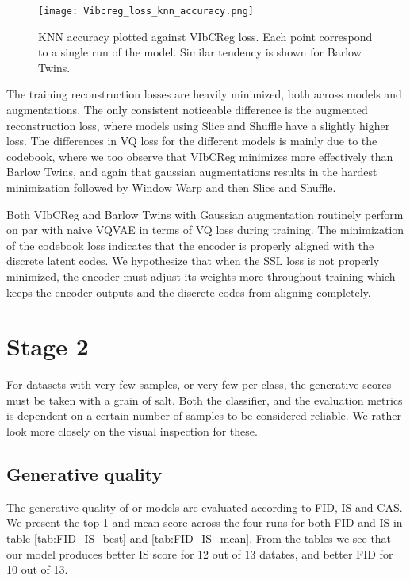 \documentclass[../../thesis.tex]{subfiles}
\begin{document}
\begin{figure}[h]
    \texttt{[image: Vibcreg\_loss\_knn\_accuracy.png]}
    \centering  
    \caption{KNN accuracy plotted against VIbCReg loss. Each point correspond to a single run of the model. Similar tendency is shown for Barlow Twins.}
    \label{fig:Vibcreg_loss_knn_accuracy}
\end{figure}

The training reconstruction losses are heavily minimized, both across models and augmentations. The only consistent noticeable difference is the augmented reconstruction loss, where models using Slice and Shuffle have a slightly higher loss. The differences in VQ loss for the different models is mainly due to the codebook, where we too observe that VIbCReg minimizes more effectively than Barlow Twins, and again that gaussian augmentations results in the hardest minimization followed by Window Warp and then Slice and Shuffle.\newline 

Both VIbCReg and Barlow Twins with Gaussian augmentation routinely perform on par with naive VQVAE in terms of VQ loss during training. The minimization of the codebook loss indicates that the encoder is properly aligned with the discrete latent codes. We hypothesize that when the SSL loss is not properly minimized, the encoder must adjust its weights more throughout training which keeps the encoder outputs and the discrete codes from aligning completely. 

\section{Stage 2}

For datasets with very few samples, or very few per class, the generative scores must be taken with a grain of salt. Both the classifier, and the evaluation metrics is dependent on a certain number of samples to be considered reliable. We rather look more closely on the visual inspection for these.  

\subsection{Generative quality}

The generative quality of or models are evaluated according to FID, IS and CAS. We present the top 1 and mean score across the four runs for both FID and IS in table \ref{tab:FID_IS_best} and \ref{tab:FID_IS_mean}. From the tables we see that our model produces better IS score for 12 out of 13 datates, and better FID for 10 out of 13.\newline
\end{document}
